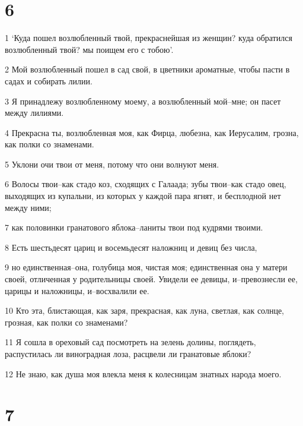 \chapter{6}

\par 1 `Куда пошел возлюбленный твой, прекраснейшая из женщин? куда обратился возлюбленный твой? мы поищем его с тобою'.
\par 2 Мой возлюбленный пошел в сад свой, в цветники ароматные, чтобы пасти в садах и собирать лилии.
\par 3 Я принадлежу возлюбленному моему, а возлюбленный мой--мне; он пасет между лилиями.
\par 4 Прекрасна ты, возлюбленная моя, как Фирца, любезна, как Иерусалим, грозна, как полки со знаменами.
\par 5 Уклони очи твои от меня, потому что они волнуют меня.
\par 6 Волосы твои--как стадо коз, сходящих с Галаада; зубы твои--как стадо овец, выходящих из купальни, из которых у каждой пара ягнят, и бесплодной нет между ними;
\par 7 как половинки гранатового яблока--ланиты твои под кудрями твоими.
\par 8 Есть шестьдесят цариц и восемьдесят наложниц и девиц без числа,
\par 9 но единственная--она, голубица моя, чистая моя; единственная она у матери своей, отличенная у родительницы своей. Увидели ее девицы, и--превознесли ее, царицы и наложницы, и--восхвалили ее.
\par 10 Кто эта, блистающая, как заря, прекрасная, как луна, светлая, как солнце, грозная, как полки со знаменами?
\par 11 Я сошла в ореховый сад посмотреть на зелень долины, поглядеть, распустилась ли виноградная лоза, расцвели ли гранатовые яблоки?
\par 12 Не знаю, как душа моя влекла меня к колесницам знатных народа моего.

\chapter{7}

